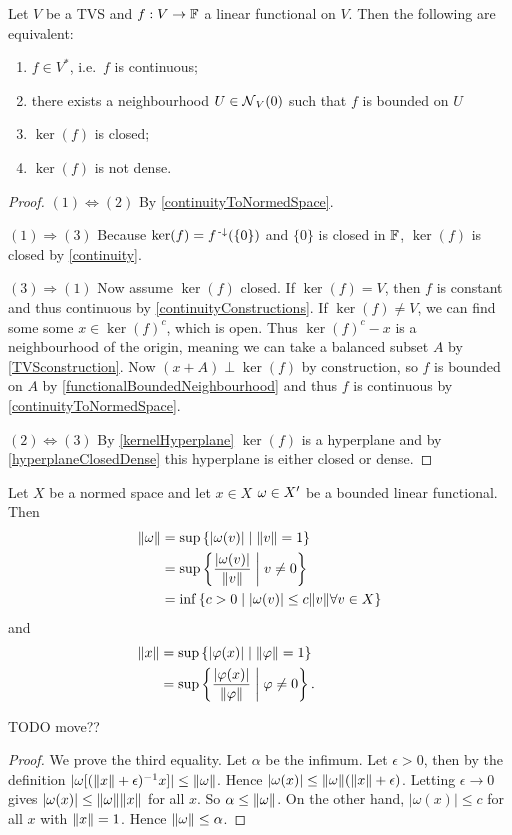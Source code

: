 \begin{proposition}
Let $V$ be a TVS and $f:V\to \mathbb{F}$ a linear functional on $V$. Then the following are equivalent:
\begin{enumerate}
\item $f\in V^{*}$, i.e.\ $f$ is continuous;
\item there exists a neighbourhood $U\in \operatorname{\mathcal{N}}_V(0)$ such that $f$ is bounded on $U$
\item $\ker(f)$ is closed;
\item $\ker(f)$ is not dense.
\end{enumerate}
\end{proposition}
\begin{proof}
$(1) \Leftrightarrow (2)$ By \ref{continuityToNormedSpace}.

$(1) \Rightarrow (3)$ Because $\ker(f) = f^{{\text{\hspace{0.15em}-}\downarrow}}(\{0\})$ and $\{0\}$ is closed in $\mathbb{F}$, $\ker(f)$ is closed by \ref{continuity}.

$(3) \Rightarrow (1)$ Now assume $\ker(f)$ closed. If $\ker(f) = V$, then $f$ is constant and thus continuous by \ref{continuityConstructions}. If $\ker(f) \neq V$, we can find some some $x\in \ker(f)^c$, which is open. Thus $\ker(f)^c - x$ is a neighbourhood of the origin, meaning we can take a balanced subset $A$ by \ref{TVSconstruction}. Now $(x+A)\perp \ker(f)$ by construction, so $f$ is bounded on $A$ by \ref{functionalBoundedNeighbourhood} and thus $f$ is continuous by \ref{continuityToNormedSpace}.

$(2) \Leftrightarrow (3)$ By \ref{kernelHyperplane} $\ker(f)$ is a hyperplane and by \ref{hyperplaneClosedDense} this hyperplane is either closed or dense.
\end{proof}



\begin{lemma} Let $X$ be a normed space and
let $x\in X$ $\omega\in {X}^\prime$ be a bounded linear functional. Then
\begin{align*}
\lVert\omega\rVert &= \sup\left\{ |\omega(v)| \;\middle|\; \lVert v\rVert=1  \right\} \\
&= \sup\left\{ \frac{|\omega(v)|}{\lVert v\rVert} \;\middle|\; v\neq 0 \right\} \\
&= \inf\left\{ c>0 \;\middle|\; |\omega(v)|\leq c\lVert v\rVert\forall v\in X \right\}
\end{align*}
and
\begin{align*}
\norm{x} &= \sup\setbuilder{|\varphi(x)|}{ \norm{\varphi}=1} \qquad\qquad\quad\\ %
&= \sup\setbuilder{\frac{|\varphi(x)|}{\norm{\varphi}}}{\varphi\neq 0}.
\end{align*}
\end{lemma}
TODO move??
\begin{proof}
We prove the third equality. Let $\alpha$ be the infimum. Let $\epsilon>0$, then by the definition $|\omega[(\lVert x\rVert+\epsilon)^{-1}x]|\leq \lVert\omega\rVert$. Hence $|\omega(x)|\leq \lVert\omega\rVert(\lVert x\rVert+\epsilon)$. Letting $\epsilon\to 0$ gives $|\omega(x)|\leq \lVert\omega\rVert\lVert x\rVert$ for all $x$. So $\alpha\leq \lVert\omega\rVert$. On the other hand, $|\omega(x)|\leq c$ for all $x$ with $\lVert x\rVert=1$. Hence $\lVert\omega\rVert\leq \alpha$.
\end{proof}


